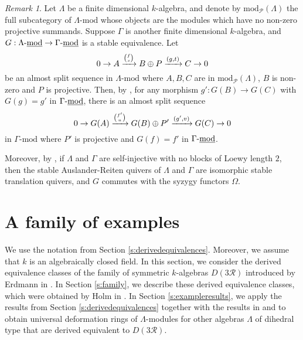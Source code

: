 \documentclass{amsart}
\theoremstyle{plain}
\theoremstyle{definition}
\theoremstyle{remark}
\newtheorem{rem}[thm]{Remark}
\begin{document}
\begin{rem}
\label{rem:stablegood}
Let $\Lambda$ be a finite dimensional $k$-algebra, and denote by $\mathrm{mod}_{\mathcal{P}}(\Lambda)$ the full subcategory of $\Lambda\mbox{-mod}$ whose objects are the modules which have no non-zero projective summands.
Suppose $\Gamma$ is another finite dimensional $k$-algebra, and 
$G:\Lambda\mbox{-\underline{mod}}\to \Gamma\mbox{-\underline{mod}}$ is a stable equivalence. 
Let
$$0\to A \xrightarrow{\genfrac{(}{)}{0pt}{}{\mbox{\tiny $f$}}{\mbox{\tiny $s$}}} B \oplus P \xrightarrow{(g,t)} C\to 0$$
be an almost split sequence in $\Lambda\mbox{-mod}$ where $A,B,C$ are in $\mathrm{mod}_{\mathcal{P}}(\Lambda)$, $B$ is non-zero 
and $P$ is projective. Then, by \cite[Prop. X.1.6]{ars}, for any morphism $g':G(B)\to G(C)$ with $G(g)=g'$ in 
$\Gamma\mbox{-\underline{mod}}$,  there is an almost split sequence
$$0\to G(A) \xrightarrow{\genfrac{(}{)}{0pt}{}{\mbox{\tiny $f'$}}{\mbox{\tiny $u$}}} G(B)  \oplus P' \xrightarrow{(g',v)} G(C)\to 0$$
in $\Gamma\mbox{-mod}$ where $P'$ is projective and $G(f)=f'$ in $\Gamma\mbox{-\underline{mod}}$.

Moreover, by \cite[Cor. X.1.9 and Prop. X.1.12]{ars}, if $\Lambda$ and $\Gamma$ are self-injective with no blocks of Loewy length $2$, 
then the stable Auslander-Reiten quivers of $\Lambda$ and $\Gamma$ are isomorphic stable translation quivers, and $G$ commutes with the syzygy functors $\Omega$.
\end{rem}

\section{A family of examples}
\label{s:examples}
\setcounter{equation}{0}

We use the notation from Section \ref{s:derivedequivalences}. Moreover, we assume that $k$ is an algebraically closed field.
In this section, we consider the derived equivalence classes of the family of symmetric $k$-algebras
$D(3\mathcal{R})$ introduced by Erdmann in \cite{erd}.  In Section \ref{s:family}, we describe these derived equivalence classes,
which were obtained by Holm in \cite[Sect. 3.2]{holm}. In Section \ref{s:exampleresults}, we apply the results from Section
\ref{s:derivedequivalences} together with the results in \cite{blehervelez} and \cite{velez2015} to
obtain universal deformation rings of $\Lambda$-modules for
other algebras $\Lambda$ of dihedral type that are derived equivalent to $D(3\mathcal{R})$.
\end{document}
